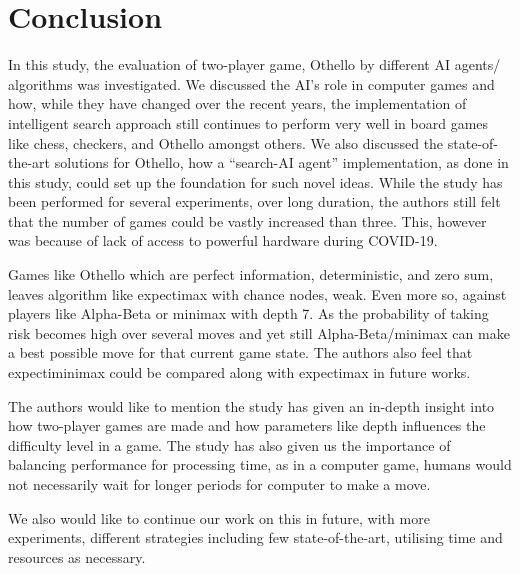 \documentclass{svproc}
\begin{document}
\section{Conclusion}\label{5}

In this study, the evaluation of two-player game, Othello by different AI agents/ algorithms was investigated. We discussed the AI's role in computer games and how, while they have changed over the recent years, the implementation of intelligent search approach still continues to perform very well in board games like chess, checkers, and Othello amongst others. We also discussed the state-of-the-art solutions for Othello, how a “search-AI agent” implementation, as done in this study, could set up the foundation for such novel ideas.
While the study has been performed for several experiments, over long duration, the authors still felt that the number of games could be vastly increased than three. This, however was because of lack of access to powerful hardware during COVID-19.

Games like Othello which are perfect information, deterministic, and zero sum, leaves algorithm like expectimax with chance nodes, weak. Even more so, against players like Alpha-Beta or minimax with depth 7. As the probability of taking risk becomes high over several moves and yet still Alpha-Beta/minimax can make a best possible move for that current game state. The authors also feel that expectiminimax could be compared along with expectimax in future works.

The authors would like to mention the study has given an in-depth insight into how two-player games are made and how parameters like depth influences the difficulty level in a game. The study has also given us the importance of balancing performance for processing time, as in a computer game, humans would not necessarily wait for longer periods for computer to make a move.

We also would like to continue our work on this in future, with more experiments, different strategies including few state-of-the-art, utilising time and resources as necessary.
\end{document}

